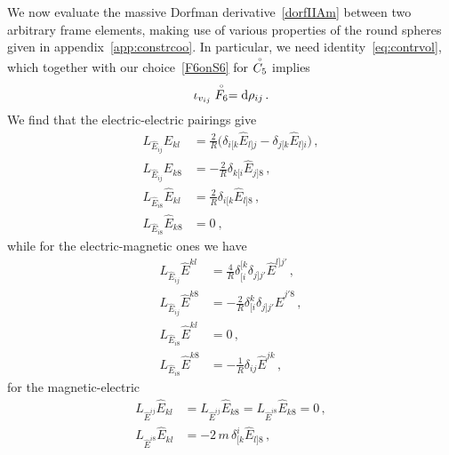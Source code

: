 \documentclass[debug]{phd}
\begin{document}
					We now evaluate the massive Dorfman derivative~\eqref{dorfIIAm} between two arbitrary frame elements, making use of various properties of the round spheres given in appendix~\ref{app:constrcoo}.
					In particular, we need identity~\eqref{eq:contrvol}, which together with our choice~\eqref{F6onS6} for $\stackrel{\scriptscriptstyle{\circ}}{C_5}$ implies
							\begin{equation}
								\iota_{v_{ij}}\stackrel{\scriptscriptstyle{\circ}}{F_6}= \mathrm{d} \rho_{ij} \, .
							\end{equation}
					We find that the electric-electric pairings give
							\begin{equation}
								\begin{split}
									L_{\hat{E}_{ij}} \hat{E}_{kl} &= \tfrac{2}{R}\big( \delta_{i[k}\hat{E}_{l]j} - \delta_{j[k}\hat{E}_{l]i} \big) \, ,\\
									L_{\hat{E}_{ij}}\hat{E}_{k8} &= -\tfrac{2}{R} \delta_{k[i}\hat{E}_{j]8} \, ,\\
									L_{\hat{E}_{i8}} \hat{E}_{kl} &= \tfrac{2}{R} \delta_{i[k}\hat{E}_{l]8} \, ,\\
									L_{\hat{E}_{i8}}\hat{E}_{k8} &= 0\ ,
								\end{split}
							\end{equation}
					while for the electric-magnetic ones we have
							\begin{equation}
								\begin{split}
									L_{\hat{E}_{ij}}\hat{E}^{kl} &= \tfrac{4}{R} \delta_{[i}^{[k} \delta_{j]j'} \hat{E}^{l]j'}\, , \\
									L_{\hat{E}_{ij}}\hat{E}^{k8} &= - \tfrac{2}{R} \delta^k_{[i} \delta_{j]j'} \hat{E}^{j'8} \, ,\\
									L_{\hat{E}_{i8}}\hat{E}^{kl} &= 0 \, ,\\
									L_{\hat{E}_{i8}}\hat{E}^{k8} &= -\tfrac{1}{R}\delta_{ij} \hat{E}^{jk}\, ,
								\end{split}
							\end{equation}
					for the magnetic-electric 
							\begin{equation}
								\begin{split}
									L_{\hat{E}^{ij}}\hat{E}_{kl} &= L_{\hat{E}^{ij}}\hat{E}_{k8} = L_{\hat{E}^{i8}}\hat{E}_{k8} = 0\, , \\
									L_{\hat{E}^{i8}}\hat{E}_{kl} &= -2\, m \,\delta^i_{[k} \hat{E}_{l]8}\, ,
								\end{split}
							\end{equation}
\end{document}
